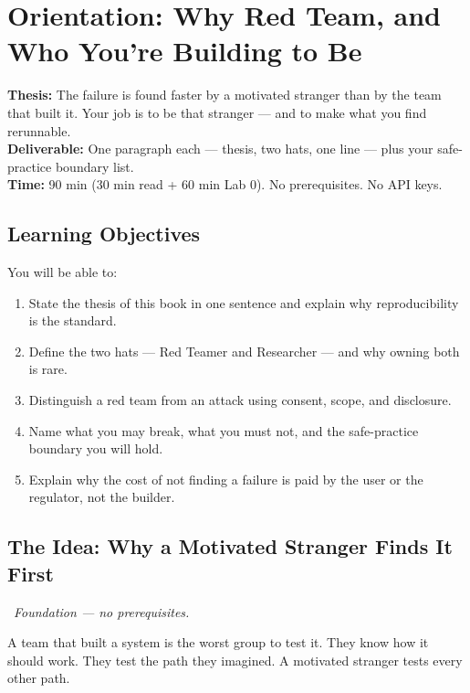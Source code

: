 \chapter{Orientation: Why Red Team, and Who You're Building to Be}
\label{ch:0}

\begin{tcolorbox}[colback=white,colframe=checkblack,title=Chapter 0 at a Glance,fonttitle=\bfseries,sharp corners,boxrule=1pt]
\textbf{Thesis:} The failure is found faster by a motivated stranger than by the team that built it. Your job is to be that stranger — and to make what you find rerunnable.\\
\textbf{Deliverable:} One paragraph each — thesis, two hats, one line — plus your safe-practice boundary list.\\
\textbf{Time:} 90 min (30 min read + 60 min Lab 0). No prerequisites. No API keys.
\end{tcolorbox}

\section{Learning Objectives}
\fbadge

You will be able to:
\begin{enumerate}
\item State the thesis of this book in one sentence and explain why reproducibility is the standard.
\item Define the two hats — Red Teamer and Researcher — and why owning both is rare.
\item Distinguish a red team from an attack using consent, scope, and disclosure.
\item Name what you may break, what you must not, and the safe-practice boundary you will hold.
\item Explain why the cost of not finding a failure is paid by the user or the regulator, not the builder.
\end{enumerate}

\section{The Idea: Why a Motivated Stranger Finds It First}
\tierF\ \textit{Foundation — no prerequisites.}

A team that built a system is the worst group to test it. They know how it should work. They test the path they imagined. A motivated stranger tests every other path.

